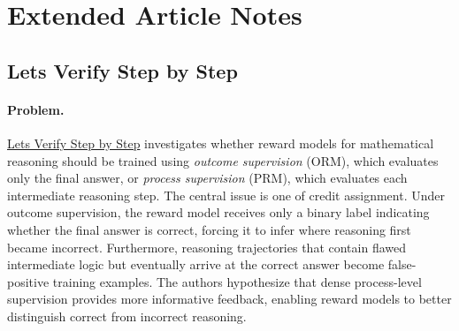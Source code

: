 \documentclass[11pt]{article}
\begin{document}

\section{Extended Article Notes}
\subsection{Lets Verify Step by Step}

\paragraph{Problem.}
\href{https://arxiv.org/abs/2305.20050}{Lets Verify Step by Step} investigates whether reward models for mathematical reasoning should be trained using \emph{outcome supervision} (ORM), which evaluates only the final answer, or \emph{process supervision} (PRM), which evaluates each intermediate reasoning step. The central issue is one of credit assignment. Under outcome supervision, the reward model receives only a binary label indicating whether the final answer is correct, forcing it to infer where reasoning first became incorrect. Furthermore, reasoning trajectories that contain flawed intermediate logic but eventually arrive at the correct answer become false-positive training examples. The authors hypothesize that dense process-level supervision provides more informative feedback, enabling reward models to better distinguish correct from incorrect reasoning.
\end{document}
